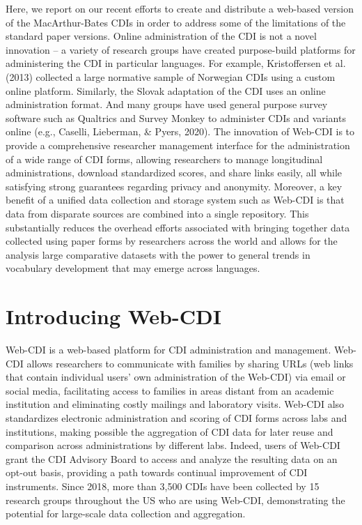 \documentclass[
  english,
  ,man,floatsintext]{apa6}
\begin{document}
Here, we report on our recent efforts to create and distribute a web-based version of the MacArthur-Bates CDIs in order to address some of the limitations of the standard paper versions. Online administration of the CDI is not a novel innovation -- a variety of research groups have created purpose-build platforms for administering the CDI in particular languages. For example, Kristoffersen et al. (2013) collected a large normative sample of Norwegian CDIs using a custom online platform. Similarly, the Slovak adaptation of the CDI uses an online administration format. And many groups have used general purpose survey software such as Qualtrics and Survey Monkey to administer CDIs and variants online (e.g., Caselli, Lieberman, \& Pyers, 2020). The innovation of Web-CDI is to provide a comprehensive researcher management interface for the administration of a wide range of CDI forms, allowing researchers to manage longitudinal administrations, download standardized scores, and share links easily, all while satisfying strong guarantees regarding privacy and anonymity. Moreover, a key benefit of a unified data collection and storage system such as Web-CDI is that data from disparate sources are combined into a single repository. This substantially reduces the overhead efforts associated with bringing together data collected using paper forms by researchers across the world and allows for the analysis large comparative datasets with the power to general trends in vocabulary development that may emerge across languages.

\hypertarget{introducing-web-cdi}{%
\section{Introducing Web-CDI}\label{introducing-web-cdi}}

Web-CDI is a web-based platform for CDI administration and management. Web-CDI allows researchers to communicate with families by sharing URLs (web links that contain individual users' own administration of the Web-CDI) via email or social media, facilitating access to families in areas distant from an academic institution and eliminating costly mailings and laboratory visits. Web-CDI also standardizes electronic administration and scoring of CDI forms across labs and institutions, making possible the aggregation of CDI data for later reuse and comparison across administrations by different labs. Indeed, users of Web-CDI grant the CDI Advisory Board to access and analyze the resulting data on an opt-out basis, providing a path towards continual improvement of CDI instruments. Since 2018, more than 3,500 CDIs have been collected by 15 research groups throughout the US who are using Web-CDI, demonstrating the potential for large-scale data collection and aggregation.
\end{document}
